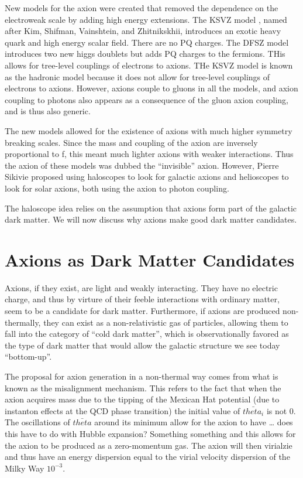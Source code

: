 \documentclass[12pt, twoside]{book}
\begin{document}
New models for the axion were created that removed the dependence on the electroweak scale by adding high energy extensions. The KSVZ model \cite{ksvz}, named after Kim, Shifman, Vainshtein, and Zhitnikskhii, introduces an exotic heavy quark and high energy scalar field. There are no PQ charges. The DFSZ model \cite{dfsz} introduces two new higgs doublets but adds PQ charges to the fermions. THis allows for tree-level couplings of electrons to axions. THe KSVZ model is known as the hadronic model because it does not allow for tree-level couplings of electrons to axions. However, axions couple to gluons in all the models, and axion coupling to photons also appears as a consequence of the gluon axion coupling, and is thus also generic. 

The new models allowed for the existence of axions with much higher symmetry breaking scales. Since the mass and coupling of the axion are inversely proportional to f, this meant much lighter axions with weaker interactions. Thus the axion of these models was dubbed the “invisible” axion. However, Pierre Sikivie \cite{sikivie} proposed using haloscopes to look for galactic axions and helioscopes to look for solar axions, both using the axion to photon coupling.

The haloscope idea relies on the assumption that axions form part of the galactic dark matter. We will now discuss why axions make good dark matter candidates.

\section{Axions as Dark Matter Candidates}

Axions, if they exist, are light and weakly interacting. They have no electric charge, and thus by virture of their feeble interactions with ordinary matter, seem to be a candidate for dark matter. Furthermore, if axions are produced non-thermally, they can exist as a non-relativistic gas of particles, allowing them to fall into the category of “cold dark matter”, which is observationally favored as the type of dark matter that would allow the galactic structure we see today “bottom-up”.

The proposal for axion generation in a non-thermal way comes from what is known as the misalignment mechanism. This refers to the fact that when the axion acquires mass due to the tipping of the Mexican Hat potential (due to instanton effects at the QCD phase transition) the initial value of $\bar{theta_i}$ is not 0. The oscillations of $\bar{theta}$ around its minimum allow for the axion to have … does this have to do with Hubble expansion? Something something and this allows for the axion to be produced as a zero-momentum gas. The axion will then virialzie and thus have an energy dispersion equal to the virial velocity dispersion of the Milky Way $10^{-3}$. 
\end{document}
